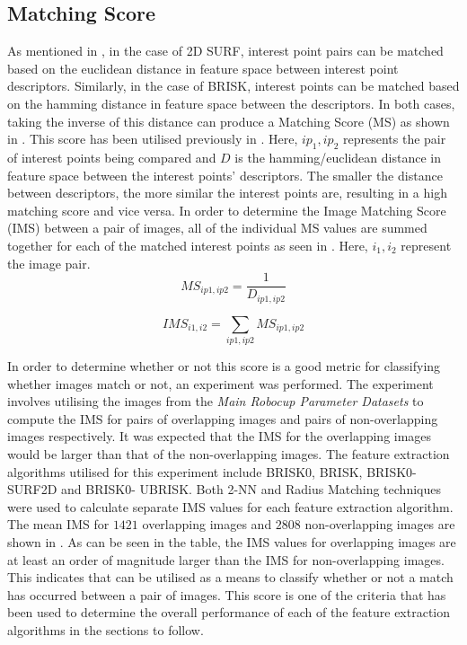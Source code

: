 \documentclass[11pt]{report}
\begin{document}
\subsection{Matching Score}
\label{sec:matchingScore}
As mentioned in , in the case of 2D SURF, interest point pairs can be matched based on the euclidean distance in feature space between interest point descriptors. Similarly, in the case of BRISK, interest points can be matched based on the hamming distance in feature space between the descriptors. In both cases, taking the inverse of this distance can produce a Matching Score (MS) as shown in . This score has been utilised previously in \citep{AndersonTechnical, Briggs}. Here, $ip_1, ip_2$ represents the pair of interest points being compared and $D$ is the hamming/euclidean distance in feature space between the interest points' descriptors. The smaller the distance between descriptors, the more similar the interest points are, resulting in a high matching score and vice versa. In order to determine the Image Matching Score (IMS) between a pair of images, all of the individual MS values are summed together for each of the matched interest points as seen in . Here, $i_1, i_2$ represent the image pair. \\

\begin{equation}
MS_{ip1, ip2} = \frac{1}{D_{ip1, ip2}}
\label{eqn:inverseDistance}
\end{equation}

\begin{equation}
IMS_{i1, i2} = \sum_{ip1, ip2} MS_{ip1, ip2}
\label{eqn:ims}
\end{equation}

In order to determine whether or not this score is a good metric for classifying whether images match or not, an experiment was performed. The experiment involves utilising the images from the \textit{Main Robocup Parameter Datasets} to compute the IMS for pairs of overlapping images and pairs of non-overlapping images respectively. It was expected that the IMS for the overlapping images would be larger than that of the non-overlapping images. The feature extraction algorithms utilised for this experiment include BRISK0, BRISK, BRISK0-SURF2D and BRISK0- UBRISK. Both 2-NN and Radius Matching techniques were used to calculate separate IMS values for each feature extraction algorithm.\\

The mean IMS for $1421$ overlapping images and $2808$ non-overlapping images are shown in . As can be seen in the table, the IMS values for overlapping images are at least an order of magnitude larger than the IMS for non-overlapping images. This indicates that  can be utilised as a means to classify whether or not a match has occurred between a pair of images. This score is one of the criteria that has been used to determine the overall performance of each of the feature extraction algorithms in the sections to follow.\\
\end{document}
